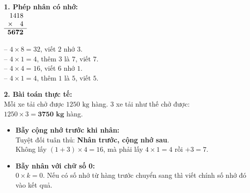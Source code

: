 \documentclass[11pt,a4paper]{article}
\begin{document}
\vspace{-2.5mm}
\noindent
\begin{minipage}[t]{0.49\textwidth}\vspace{0pt}
\begin{tcolorbox}[
  enhanced,
  colback=green!4!white,
  colframe=green!60!black,
  arc=2mm, boxrule=0.8pt,
  left=2mm, right=2mm, top=1.8mm, bottom=1.8mm,
  title={\footnotesize\bfseries\color{white}\faCheckCircle\ Ví dụ thực hành chuẩn mực}
]
{\footnotesize
\textbf{1. Phép nhân có nhớ:}\\
$\begin{array}{r@{}l}
  1418 & \\
  \times\quad 4 & \\
  \hline
  \mathbf{5672} &
\end{array}$
\qquad
\begin{minipage}[c]{0.5\linewidth}
-- $4 \times 8 = 32$, viết $2$ nhớ $3$.\\
-- $4 \times 1 = 4$, thêm $3$ là $7$, viết $7$.\\
-- $4 \times 4 = 16$, viết $6$ nhớ $1$.\\
-- $4 \times 1 = 4$, thêm $1$ là $5$, viết $5$.
\end{minipage}

\textbf{2. Bài toán thực tế:}\\
Mỗi xe tải chở được $1250\text{ kg}$ hàng. $3$ xe tải như thế chở được:\\
$1250 \times 3 = \mathbf{3750\text{ kg}}$ hàng.
}
\end{tcolorbox}
\end{minipage}
\hfill
\begin{minipage}[t]{0.49\textwidth}\vspace{0pt}
\begin{tcolorbox}[
  enhanced,
  colback=red!4!white,
  colframe=red!70!black,
  arc=2mm, boxrule=0.8pt,
  left=2mm, right=2mm, top=1.8mm, bottom=1.8mm,
  title={\footnotesize\bfseries\color{white}\faExclamationTriangle\ Mẹo tránh bẫy trắc nghiệm}
]
{\footnotesize
\begin{itemize}\setlength{\itemsep}{1.5pt}\setlength{\leftskip}{-2.5mm}
  \item \textbf{Bẫy cộng nhớ trước khi nhân:}\\
  Tuyệt đối tuân thủ: \textbf{Nhân trước, cộng nhớ sau}.\\
  Không lấy $(1 + 3) \times 4 = 16$, mà phải lấy $4 \times 1 = 4$ rồi $+ 3 = 7$.
  \item \textbf{Bẫy nhân với chữ số 0:}\\
  $0 \times k = 0$. Nếu có số nhớ từ hàng trước chuyển sang thì viết chính số nhớ đó vào kết quả.
\end{itemize}
}
\end{tcolorbox}
\end{minipage}
\end{document}
